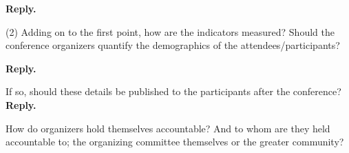 \documentclass{article}
\newenvironment{Reply}{\noindent\color{BlueViolet}\textbf{Reply.}}{\vspace{1em}}
\begin{document}
\begin{Reply}

\end{Reply}

(2) Adding on to the first point, how are the indicators measured? Should the conference organizers quantify the demographics of the attendees/participants? 

\begin{Reply}
\end{Reply}

If so, should these details be published to the participants after the conference? 
\begin{Reply}
\end{Reply}

How do organizers hold themselves accountable? And to whom are they held accountable to; the organizing committee themselves or the greater community?
\end{document}
